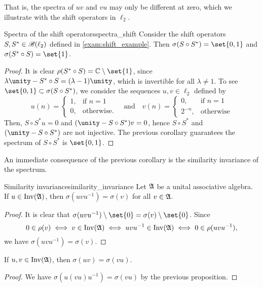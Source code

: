 That is, the spectra of \(uv\) and \(vu\) may only be different at zero, which we illustrate with the shift operators in \(\ell_2\).
\begin{example}{Spectra of the shift operators}{spectra_shift}
    Consider the shift operators \(S, S^* \in \mathscr{B}(\ell_2)\) defined in \cref{exam:shift_example}. Then \(\sigma(S\circ S^*) = \set{0,1}\) and \(\sigma(S^* \circ S) = \set{1}\).
\end{example}
\begin{proof}
    It is clear \(\rho(S^*\circ S) = \mathbb{C} \setminus \set{1}\), since \(\lambda\unity - S^* \circ S = (\lambda - 1)\unity\), which is invertible for all \(\lambda \neq 1\). To see \(\set{0,1}\subset\sigma(S \circ S^*)  \), we consider the sequences \(u,v \in \ell_2\) defined by
    \begin{equation*}
        u(n) = \begin{cases}
            1,&\text{if }n = 1\\
            0,&\text{otherwise}.
        \end{cases}
        \quad\text{and}\quad
        v(n) = \begin{cases}
            0,&\text{if }n = 1\\
            2^{-n},&\text{otherwise}
        \end{cases}
    \end{equation*}
    Then, \(S \circ S^*u = 0\) and \((\unity - S \circ S^*)v = 0\), hence \(S \circ S^*\) and \((\unity - S\circ S^*)\) are not injective. The previous corollary guarantees the spectrum of \(S\circ S^*\) is \(\set{0,1}\).
\end{proof}

An immediate consequence of the previous corollary is the similarity invariance of the spectrum.
\begin{proposition}{Similarity invariance}{similarity_invariance}
    Let \(\mathfrak{A}\) be a unital associative algebra. If \(u \in \operatorname{Inv}(\mathfrak{A})\), then \(\sigma(uvu^{-1}) = \sigma(v)\) for all \(v \in \mathfrak{A}\).
\end{proposition}
\begin{proof}
    It is clear that \(\sigma(uvu^{-1})\setminus\set{0} = \sigma(v)\setminus\set{0}\). Since
    \begin{equation*}
        0 \in \rho(v) \iff v \in \operatorname{Inv}(\mathfrak{A}) \iff uvu^{-1} \in \operatorname{Inv}(\mathfrak{A}) \iff 0 \in \rho(uvu^{-1}),
    \end{equation*}
    we have \(\sigma(uvu^{-1}) = \sigma(v)\).
\end{proof}
\begin{corollary}
    If \(u,v \in \operatorname{Inv}(\mathfrak{A})\), then \(\sigma(uv) = \sigma(vu)\).
\end{corollary}
\begin{proof}
    We have \(\sigma(u(vu)u^{-1}) = \sigma(vu)\) by the previous proposition.
\end{proof}

